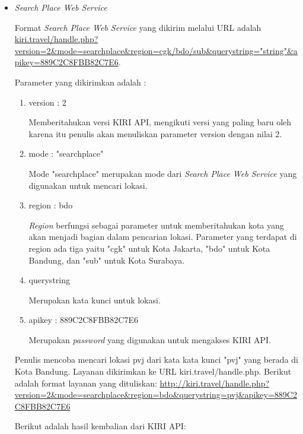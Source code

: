 \begin{itemize}
	\item \textit{Search Place Web Service}
	
	Format \textit{Search Place Web Service} yang dikirim melalui URL adalah \url{kiri.travel/handle.php?version=2\&mode=searchplace\&region=cgk/bdo/sub\&querystring="string"\&apikey=889C2C8FBB82C7E6}.
	
	Parameter yang dikirimkan adalah :
	
	\begin{enumerate}
		\item version : 2
		
		Memberitahukan versi KIRI API, mengikuti versi yang paling baru oleh karena itu penulis akan menuliskan parameter version dengan nilai 2.
		\item mode : "searchplace"
		
		Mode "searchplace" merupakan mode dari \textit{Search Place Web Service} yang digunakan untuk mencari lokasi.
		\item region : bdo
		
		\textit{Region} berfungsi sebagai parameter untuk memberitahukan kota yang akan menjadi bagian dalam pencarian lokasi. Parameter yang terdapat di region ada tiga yaitu "cgk" untuk Kota Jakarta, "bdo" untuk Kota Bandung, dan "sub" untuk Kota Surabaya.
		\item querystring
		
		Merupakan kata kunci untuk lokasi.
		\item apikey : 889C2C8FBB82C7E6
		
		Merupakan \textit{password} yang digunakan untuk mengakses KIRI API.
	\end{enumerate}
	
	Penulis mencoba mencari lokasi pvj dari kata kata kunci "pvj" yang berada di Kota Bandung. Layanan dikirimkan ke URL kiri.travel/handle.php. Berikut adalah format layanan yang dituliskan: \url{http://kiri.travel/handle.php?version=2\&mode=searchplace\&region=bdo\&querystring=pvj\&apikey=889C2C8FBB82C7E6}
	
	Berikut adalah hasil kembalian dari KIRI API:
	

\end{itemize}
